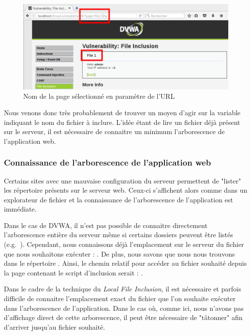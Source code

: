 \begin{figure}[!h]
\begin{center}
\includegraphics[scale=.5]{images/fi2.png}

\caption{Nom de la page sélectionné en paramètre de l'URL}
\label{fi_dvwa2}
\end{center}
\end{figure}

Nous venons donc très probablement de trouver un moyen d'agir sur la variable indiquant le nom du fichier à inclure. L'idée étant de lire un fichier déjà présent sur le serveur, il est nécessaire de connaitre un minimum l'arborescence de l'application web. 

\subsubsection{Connaissance de l'arborescence de l'application web}
\label{arb}

Certains sites avec une mauvaise configuration du serveur permettent de "lister" les répertoire présents sur le serveur web. Ceux-ci s'affichent alors comme dans un explorateur de fichier et la connaissance de l'arborescence de l'application est immédiate.

Dans le cas de DVWA, il n'est pas possible de connaitre directement l'arborescence entière du serveur même si certains dossiers peuvent être listés (e.g.\ ). Cependant, nous connaissons déjà l'emplacement sur le serveur du fichier que nous souhaitons exécuter : . De plus, nous savons que nous nous trouvons dans le répertoire . Ainsi, le chemin relatif pour accéder au fichier souhaité depuis la page contenant le script d'inclusion serait : .

Dans le cadre de la technique du \textit{Local File Inclusion}, il est nécessaire et parfois difficile de connaitre l'emplacement exact du fichier que l'on souhaite exécuter dans l'arborescence de l'application. Dans le cas où, comme ici, nous n'avons pas d'affichage direct de cette arborescence, il peut être nécessaire de "tâtonner" afin d'arriver jusqu'au fichier souhaité.

